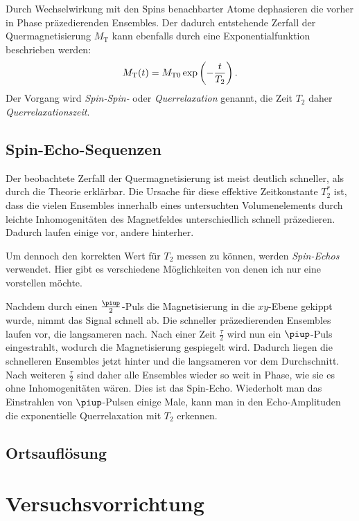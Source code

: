 \documentclass[
    11pt,
    ngerman
]{scrreprt}
\begin{document}
Durch Wechselwirkung mit den Spins benachbarter Atome dephasieren die vorher in
Phase präzedierenden Ensembles. Der dadurch entstehende Zerfall der
Quermagnetisierung $M_\text{T}$ kann ebenfalls durch eine Exponentialfunktion
beschrieben werden:
\[
    M_\text{T}(t) = M_{\text{T}0}\exp\left({-\frac{t}{T_2}}\right).
\]
Der Vorgang wird \emph{Spin-Spin-} oder \emph{Querrelaxation} genannt, die Zeit $T_2$ daher \emph{Querrelaxationszeit}. 


\subsection{Spin-Echo-Sequenzen}

Der beobachtete Zerfall der Quermagnetisierung ist meist deutlich schneller,
als durch die Theorie erklärbar. Die Ursache für diese effektive Zeitkonstante
$T_2^*$ ist, dass die vielen Ensembles innerhalb eines untersuchten
Volumenelements durch leichte Inhomogenitäten des Magnetfeldes unterschiedlich
schnell präzedieren. Dadurch laufen einige vor, andere hinterher.

Um dennoch den korrekten Wert für $T_2$ messen zu können, werden
\emph{Spin-Echos} verwendet. Hier gibt es verschiedene Möglichkeiten von denen
ich nur eine vorstellen möchte.

Nachdem durch einen $\frac\piup2$-Puls die Magnetisierung in die $xy$-Ebene
gekippt wurde, nimmt das Signal schnell ab. Die schneller präzedierenden
Ensembles laufen vor, die langsameren nach. Nach einer Zeit $\frac\tau2$ wird
nun ein $\piup$-Puls eingestrahlt, wodurch die Magnetisierung gespiegelt wird.
Dadurch liegen die schnelleren Ensembles jetzt hinter und die langsameren vor
dem Durchschnitt. Nach weiteren $\frac\tau2$ sind daher alle Ensembles wieder
so weit in Phase, wie sie es ohne Inhomogenitäten wären. Dies ist das
Spin-Echo. Wiederholt man das Einstrahlen von $\piup$-Pulsen einige Male, kann
man in den Echo-Amplituden die exponentielle Querrelaxation mit $T_2$ erkennen.

\subsection{Ortsauflösung}

\section{Versuchsvorrichtung}
\end{document}
